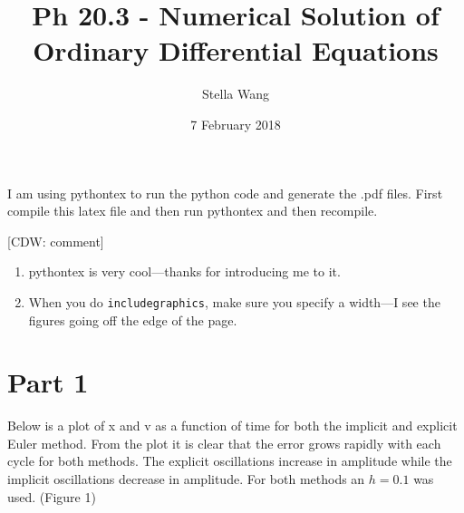 \documentclass{article}
\title{Ph 20.3 - Numerical Solution of Ordinary Differential Equations
           \cdw{PASS}}
\author{Stella Wang}
\date{ 7 February 2018}
\newcommand{\cdw}[1]
           {{\color{blue} [CDW: comment] #1}}
\begin{document}
	\maketitle
        I am using pythontex to run the python code and generate the .pdf files. First compile this latex file and then run pythontex and then recompile.

        \cdw{
          \begin{enumerate}
          \item pythontex is very cool---thanks for introducing me to it.
          \item When you do \texttt{includegraphics}, make sure you specify a width---I see the figures going off the edge of the page.
          \end{enumerate}
            }

\section{Part 1}

Below is a plot of x and v as a function of time for both the implicit and explicit Euler method. From the plot it is clear that the error grows rapidly with each cycle for both methods. The explicit oscillations increase in amplitude while the implicit oscillations decrease in amplitude. For both methods an $h = 0.1$ was used. (Figure 1)
\end{document}

